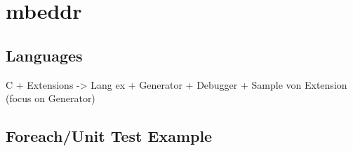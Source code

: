 \section{mbeddr}

\subsection{Languages}
C + Extensions 
	    -> Lang ex +  Generator + Debugger
		+ Sample von Extension (focus on Generator)
		
\subsection{Foreach/Unit Test Example}
